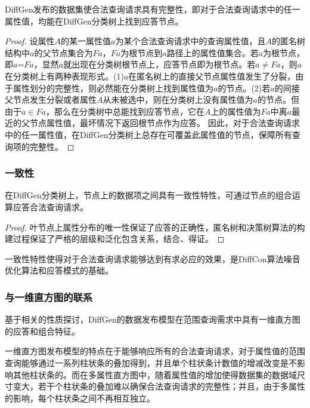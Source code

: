 \begin{prop}
	\label{chap4_prop3}
	DiffGen发布的数据集使合法查询请求具有完整性，即对于合法查询请求中的任一属性值，均能在DiffGen分类树上找到应答节点。
\end{prop}
\begin{proof}
	设属性$A$的某一属性值$a$为某个合法查询请求中的查询属性值，且$A$的匿名树结构中$a$的父节点集合为$Fa$，$Fa$为根节点到$a$路径上的属性值集合。若$a$为根节点，即$a$=$Fa$，显然$a$就出现在分类树根节点上，应答节点即为根节点。若$a$$\neq$$Fa$，则$a$在分类树上有两种表现形式。(1)$a$在匿名树上的直接父节点属性值发生了分裂，由于\label{chap4_prop2}属性划分的完整性，则必然能在分类树上找到属性值为$a$的节点。(2)若$a$的间接父节点发生分裂或者属性$A$从未被选中，则在分类树上没有属性值为$a$的节点。但由于$a$$\in$$Fa$，那么在分类树中总能找到应答节点，它在$A$上的属性值为$Fa$中离$a$最近的父节点属性值，最坏情况下返回根节点作为应答。
	因此，对于合法查询请求中的任一属性值，在DiffGen分类树上总存在可覆盖此属性值的节点，保障所有查询项的完整性。
\end{proof}

\subsubsection{一致性}

\begin{prop}
	\label{chap4_prop4}
	在DiffGen分类树上，节点上的数据项之间具有一致性特性，可通过节点的组合运算应答合法查询请求。
\end{prop}
\begin{proof}
	叶节点上属性分布的唯一性保证了应答的正确性，匿名树和决策树算法的构建过程保证了严格的层级和泛化包含关系，结合\label{chap4_prop2}、\label{chap4_prop3}得证。
\end{proof}

一致性特性使得对于合法查询请求能够达到有求必应的效果，是DiffCon算法噪音优化算法和应答模式的基础。

\subsubsection{与一维直方图的联系} %


基于相关的性质探讨，DiffGen的数据发布模型在范围查询需求中具有一维直方图的应答和组合特征。

一维直方图发布模型的特点在于能够响应所有的合法查询请求，对于属性值的范围查询能够通过一系列柱状条的叠加得到，并且单个柱状条计数值的增减改变是不影响其他柱状条的。而在多属性直方图中，随着属性值的增加使得数据集的数据域尺寸变大，若干个柱状条的叠加难以确保合法查询请求的完整性；并且，由于多属性的影响，每个柱状条之间不再相互独立。

